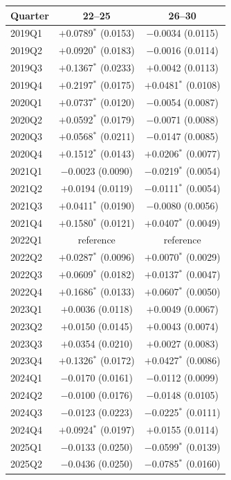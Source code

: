 \begin{tabular}{lcc}
\toprule
Quarter & 22--25 & 26--30 \\
\midrule
2019Q1 & $+$0.0789$^{*}$ (0.0153) & $-$0.0034 (0.0115) \\
2019Q2 & $+$0.0920$^{*}$ (0.0183) & $-$0.0016 (0.0114) \\
2019Q3 & $+$0.1367$^{*}$ (0.0233) & $+$0.0042 (0.0113) \\
2019Q4 & $+$0.2197$^{*}$ (0.0175) & $+$0.0481$^{*}$ (0.0108) \\
2020Q1 & $+$0.0737$^{*}$ (0.0120) & $-$0.0054 (0.0087) \\
2020Q2 & $+$0.0592$^{*}$ (0.0179) & $-$0.0071 (0.0088) \\
2020Q3 & $+$0.0568$^{*}$ (0.0211) & $-$0.0147 (0.0085) \\
2020Q4 & $+$0.1512$^{*}$ (0.0143) & $+$0.0206$^{*}$ (0.0077) \\
2021Q1 & $-$0.0023 (0.0090) & $-$0.0219$^{*}$ (0.0054) \\
2021Q2 & $+$0.0194 (0.0119) & $-$0.0111$^{*}$ (0.0054) \\
2021Q3 & $+$0.0411$^{*}$ (0.0190) & $-$0.0080 (0.0056) \\
2021Q4 & $+$0.1580$^{*}$ (0.0121) & $+$0.0407$^{*}$ (0.0049) \\
2022Q1 & reference & reference \\
2022Q2 & $+$0.0287$^{*}$ (0.0096) & $+$0.0070$^{*}$ (0.0029) \\
2022Q3 & $+$0.0609$^{*}$ (0.0182) & $+$0.0137$^{*}$ (0.0047) \\
2022Q4 & $+$0.1686$^{*}$ (0.0133) & $+$0.0607$^{*}$ (0.0050) \\
2023Q1 & $+$0.0036 (0.0118) & $+$0.0049 (0.0067) \\
2023Q2 & $+$0.0150 (0.0145) & $+$0.0043 (0.0074) \\
2023Q3 & $+$0.0354 (0.0210) & $+$0.0027 (0.0083) \\
2023Q4 & $+$0.1326$^{*}$ (0.0172) & $+$0.0427$^{*}$ (0.0086) \\
2024Q1 & $-$0.0170 (0.0161) & $-$0.0112 (0.0099) \\
2024Q2 & $-$0.0100 (0.0176) & $-$0.0148 (0.0105) \\
2024Q3 & $-$0.0123 (0.0223) & $-$0.0225$^{*}$ (0.0111) \\
2024Q4 & $+$0.0924$^{*}$ (0.0197) & $+$0.0155 (0.0114) \\
2025Q1 & $-$0.0133 (0.0250) & $-$0.0599$^{*}$ (0.0139) \\
2025Q2 & $-$0.0436 (0.0250) & $-$0.0785$^{*}$ (0.0160) \\

\end{tabular}
